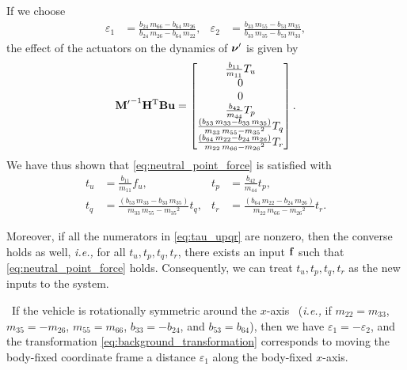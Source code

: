 If we choose
\begin{align}
    \varepsilon_1 &= \frac{b_{24}\,m_{66}-b_{64}\,m_{26}}{b_{24}\,m_{26}-b_{64}\,m_{22}}, &
    \varepsilon_2 &= \frac{b_{33}\,m_{55}-b_{53}\,m_{35}}{b_{33}\,m_{35}-b_{53}\,m_{33}},
\end{align}
the effect of the actuators on the dynamics of $\bm{\nu}^{\prime}$ is given by
\begin{equation}
    {\mathbf{M}^{\prime}}^{-1}\mathbf{H}^{\mathrm{T}}\mathbf{B}\mathbf{u} =
    \begin{bmatrix}
        \frac{b_{11}}{m_{11}} T_{u} \\
        0 \\ 
        0 \\ 
        \frac{b_{42}}{m_{44}} T_{p} \\ 
        \frac{\left(b_{53}\,m_{33}-b_{33}\,m_{35}\right)}{m_{33}\,m_{55}-{m_{35}}^2} T_{q} \\ 
        \frac{\left(b_{64}\,m_{22}-b_{24}\,m_{26}\right)}{m_{22}\,m_{66}-{m_{26}}^2} T_{r}
    \end{bmatrix}.
\end{equation}
We have thus shown that \eqref{eq:neutral_point_force} is satisfied with
\begin{subequations}
    \begin{align}
        t_u &= \frac{b_{11}}{m_{11}} f_{u}, &
        t_p &= \frac{b_{42}}{m_{44}} t_{p}, \\
        t_q &= \frac{\left(b_{53}\,m_{33}-b_{33}\,m_{35}\right)}{m_{33}\,m_{55}-{m_{35}}^2} t_{q}, &
        t_r &= \frac{\left(b_{64}\,m_{22}-b_{24}\,m_{26}\right)}{m_{22}\,m_{66}-{m_{26}}^2} t_{r}.
    \end{align} 
    \label{eq:tau_upqr}
\end{subequations}

\noindent Moreover, if all the numerators in \eqref{eq:tau_upqr} are nonzero, then the converse holds as well, \emph{i.e.,} for all $t_u, t_p, t_q, t_r$, there exists an input $\mathbf{f}$ such that \eqref{eq:neutral_point_force} holds.
Consequently, we can treat $t_u, t_p, t_q, t_r$ as the new inputs to the system.

\begin{rmk*}
    ~If the vehicle is rotationally symmetric around the $x$-axis ~(\emph{i.e.,} if $m_{22} = m_{33}$, $m_{35} = -m_{26}$, $m_{55} = m_{66}$, $b_{33} = -b_{24}$, and $b_{53} = b_{64}$), then we have $\varepsilon_1 = -\varepsilon_2$, and the transformation \eqref{eq:background_transformation} corresponds to moving the body-fixed coordinate frame a distance $\varepsilon_1$ along the body-fixed $x$-axis.
\end{rmk*}


